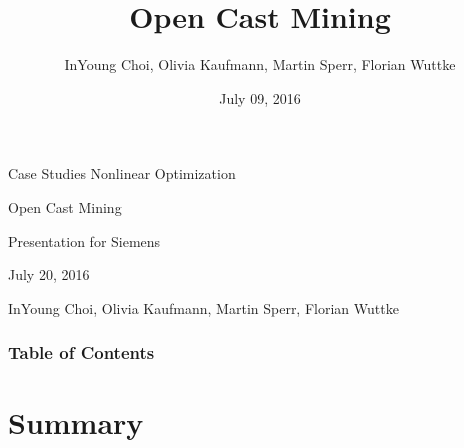 \documentclass[table]{beamer}
\title[Kurzform]{Open Cast Mining}
\author{InYoung Choi, Olivia Kaufmann, Martin Sperr, Florian Wuttke}
\date{July 09, 2016}
\begin{document}

\begin{frame}[c]
	\begin{center}
		\large{Case Studies Nonlinear Optimization}
	\end{center}
	\vspace{0.5cm}
	\begin{center}
		\Huge{\textcolor{TUMblue2}{Open Cast Mining}}
	\end{center}
	\begin{center}
		\large{Presentation for Siemens}
	\end{center}
	\vspace{0.5cm}
	\begin{center}
		July 20, 2016
	\end{center}
	\vspace{0.5cm}
	\begin{center}
		\small{InYoung Choi, Olivia Kaufmann, Martin Sperr, Florian Wuttke}
	\end{center}
\end{frame}

\begin{frame}[c]
	\frametitle{Table of Contents}
	\tableofcontents
\end{frame}





%






\section{Summary}
\end{document}
